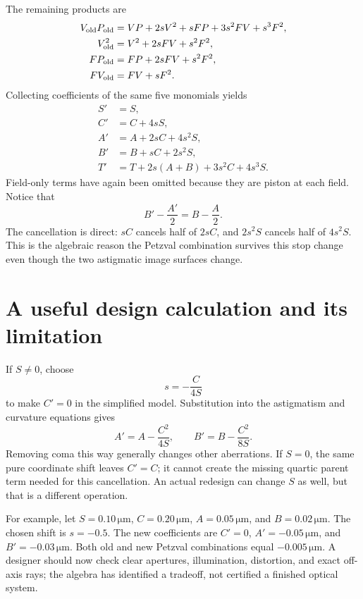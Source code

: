 The remaining products are
\begin{align}
 V_{\rm old}P_{\rm old}
 &=VP+2sV^2+sFP+3s^2FV+s^3F^2,\\
 V_{\rm old}^2&=V^2+2sFV+s^2F^2,\\
 FP_{\rm old}&=FP+2sFV+s^2F^2,\\
 FV_{\rm old}&=FV+sF^2.
\end{align}
Collecting coefficients of the same five monomials yields
\begin{align}
 S'&=S,\\
 C'&=C+4sS,\\
 A'&=A+2sC+4s^2S,\\
 B'&=B+sC+2s^2S,\\
 T'&=T+2s(A+B)+3s^2C+4s^3S.
 \label{ab:stopcoefficients}
\end{align}
Field-only terms have again been omitted because they are piston at each
field. Notice that
\begin{equation}
 B'-\frac{A'}{2}=B-\frac{A}{2}.
\end{equation}
The cancellation is direct: $sC$ cancels half of $2sC$, and $2s^2S$ cancels
half of $4s^2S$. This is the algebraic reason the Petzval combination survives
this stop change even though the two astigmatic image surfaces change.

\section{A useful design calculation and its limitation}
If $S\ne0$, choose
\begin{equation}
 s=-\frac{C}{4S}
\end{equation}
to make $C'=0$ in the simplified model. Substitution into the astigmatism and
curvature equations gives
\begin{equation}
 A'=A-\frac{C^2}{4S},\qquad
 B'=B-\frac{C^2}{8S}.
\end{equation}
Removing coma this way generally changes other aberrations. If $S=0$, the
same pure coordinate shift leaves $C'=C$; it cannot create the missing
quartic parent term needed for this cancellation. An actual redesign can
change $S$ as well, but that is a different operation.

For example, let $S=0.10\,\mathrm{\mu m}$,
$C=0.20\,\mathrm{\mu m}$, $A=0.05\,\mathrm{\mu m}$, and
$B=0.02\,\mathrm{\mu m}$. The chosen shift is $s=-0.5$.
The new coefficients are $C'=0$, $A'=-0.05\,\mathrm{\mu m}$,
and $B'=-0.03\,\mathrm{\mu m}$. Both old and new Petzval combinations
equal $-0.005\,\mathrm{\mu m}$. A designer should now check clear apertures,
illumination, distortion, and exact off-axis rays; the algebra has identified
a tradeoff, not certified a finished optical system.

